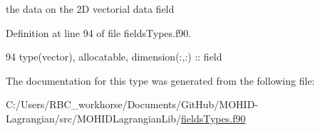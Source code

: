 the data on the 2D vectorial data field 



Definition at line 94 of file fields\+Types.\+f90.


\begin{DoxyCode}
94         \textcolor{keywordtype}{type}(vector), \textcolor{keywordtype}{allocatable}, \textcolor{keywordtype}{dimension(:,:)} :: field
\end{DoxyCode}


The documentation for this type was generated from the following file\+:\begin{DoxyCompactItemize}
\item 
C\+:/\+Users/\+R\+B\+C\+\_\+workhorse/\+Documents/\+Git\+Hub/\+M\+O\+H\+I\+D-\/\+Lagrangian/src/\+M\+O\+H\+I\+D\+Lagrangian\+Lib/\mbox{\hyperlink{fields_types_8f90}{fields\+Types.\+f90}}\end{DoxyCompactItemize}
